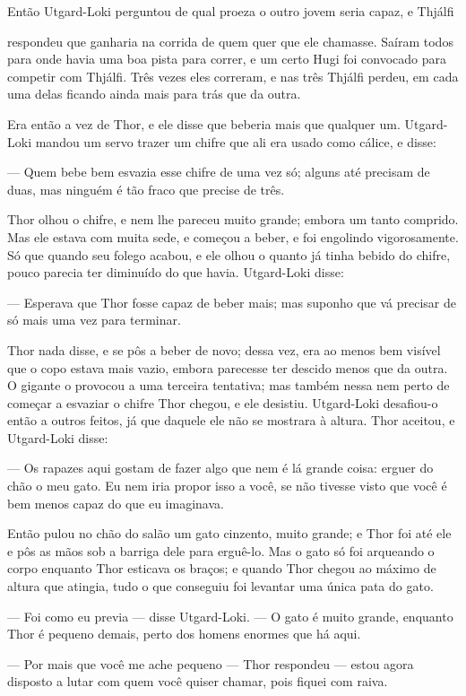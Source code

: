 Então Utgard-Loki perguntou de qual proeza o outro jovem seria capaz,
e Thjálfi

respondeu que ganharia na corrida de quem quer que ele chamasse.
Saíram todos para onde havia uma boa pista para correr, e um certo
Hugi foi convocado para competir com Thjálfi. Três vezes eles
correram, e nas três Thjálfi perdeu, em cada uma delas ficando ainda
mais para trás que da outra. 

Era então a vez de Thor, e ele disse que beberia mais que qualquer um.
Utgard-Loki mandou um servo trazer um chifre que ali era usado como
cálice, e disse:

— Quem bebe bem esvazia esse chifre de uma vez só; alguns até precisam
de duas, mas ninguém é tão fraco que precise de três.

Thor olhou o chifre, e nem lhe pareceu muito grande; embora um tanto
comprido. Mas ele estava com muita sede, e começou a beber, e foi
engolindo vigorosamente. Só que quando seu folego acabou, e ele olhou
o quanto já tinha bebido do chifre, pouco parecia ter diminuído do
que havia. Utgard-Loki disse:

— Esperava que Thor fosse capaz de beber mais; mas suponho que vá
precisar de só mais uma vez para terminar.

Thor nada disse, e se pôs a beber de novo; dessa vez, era ao menos bem
visível que o copo estava mais vazio, embora parecesse ter descido
menos que da outra. O gigante o provocou a uma terceira tentativa;
mas também nessa nem perto de começar a esvaziar o chifre Thor
chegou, e ele desistiu. Utgard-Loki desafiou-o então a outros feitos,
já que daquele ele não se mostrara à altura. Thor aceitou, e
Utgard-Loki disse:

— Os rapazes aqui gostam de fazer algo que nem é lá grande coisa:
erguer do chão o meu gato. Eu nem iria propor isso a você, se não
tivesse visto que você é bem menos capaz do que eu imaginava. 

Então pulou no chão do salão um gato cinzento, muito grande; e Thor
foi até ele e pôs as mãos sob a barriga dele para erguê-lo. Mas o
gato só foi arqueando o corpo enquanto Thor esticava os braços; e
quando Thor chegou ao máximo de altura que atingia, tudo o que
conseguiu foi levantar uma única pata do gato. 

— Foi como eu previa — disse Utgard-Loki. — O gato é muito grande,
enquanto Thor é pequeno demais, perto dos homens enormes que há aqui.


— Por mais que você me ache pequeno — Thor respondeu — estou agora
disposto a lutar com quem você quiser chamar, pois fiquei com raiva. 

